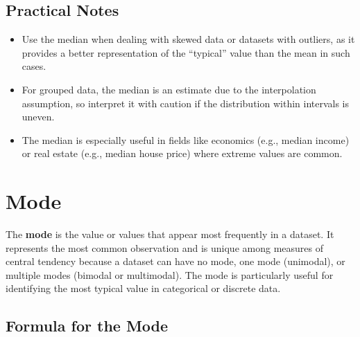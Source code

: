 \documentclass[11pt]{article}
\begin{document}
\subsection*{Practical Notes}

\begin{itemize}
    \item Use the median when dealing with skewed data or datasets with outliers, as it provides a better representation of the “typical” value than the mean in such cases.
    \item For grouped data, the median is an estimate due to the interpolation assumption, so interpret it with caution if the distribution within intervals is uneven.
    \item The median is especially useful in fields like economics (e.g., median income) or real estate (e.g., median house price) where extreme values are common.
\end{itemize}

\section{Mode}

The \textbf{mode} is the value or values that appear most frequently in a dataset. It represents the most common observation and is unique among measures of central tendency because a dataset can have no mode, one mode (unimodal), or multiple modes (bimodal or multimodal). The mode is particularly useful for identifying the most typical value in categorical or discrete data.

\subsection*{Formula for the Mode}
\end{document}
